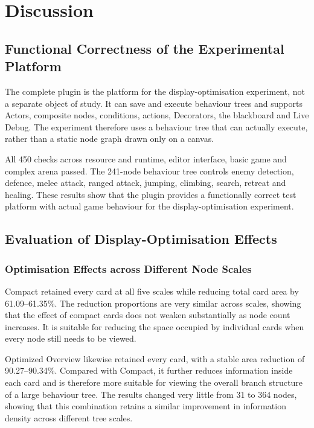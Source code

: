 \chapter{Discussion}
\label{ch:discussion}

\section{Functional Correctness of the Experimental Platform}

The complete plugin is the platform for the display-optimisation experiment, not a separate object of study. It can save and execute behaviour trees and supports Actors, composite nodes, conditions, actions, Decorators, the blackboard and Live Debug. The experiment therefore uses a behaviour tree that can actually execute, rather than a static node graph drawn only on a canvas.

All 450 checks across resource and runtime, editor interface, basic game and complex arena passed. The 241-node behaviour tree controls enemy detection, defence, melee attack, ranged attack, jumping, climbing, search, retreat and healing. These results show that the plugin provides a functionally correct test platform with actual game behaviour for the display-optimisation experiment.

\section{Evaluation of Display-Optimisation Effects}

\subsection{Optimisation Effects across Different Node Scales}

Compact retained every card at all five scales while reducing total card area by 61.09--61.35\%. The reduction proportions are very similar across scales, showing that the effect of compact cards does not weaken substantially as node count increases. It is suitable for reducing the space occupied by individual cards when every node still needs to be viewed.

Optimized Overview likewise retained every card, with a stable area reduction of 90.27--90.34\%. Compared with Compact, it further reduces information inside each card and is therefore more suitable for viewing the overall branch structure of a large behaviour tree. The results changed very little from 31 to 364 nodes, showing that this combination retains a similar improvement in information density across different tree scales.

